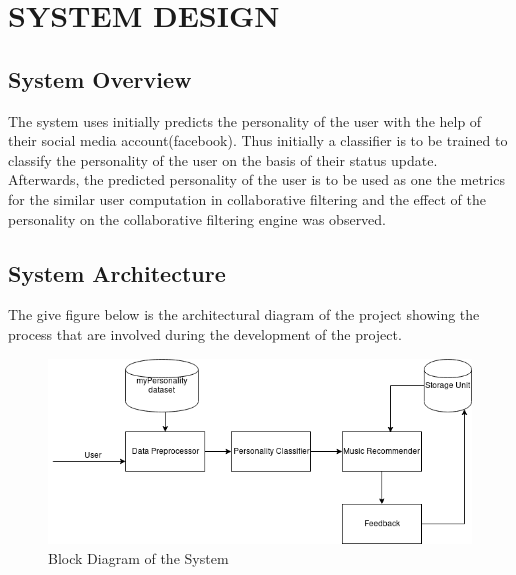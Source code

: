 \newpage
\section{SYSTEM DESIGN}

\subsection{System Overview}
The system uses initially predicts the personality of the user with the help of their social media account(facebook). Thus initially a classifier is to be trained to classify the personality of the user on the basis of their status update. Afterwards, the predicted personality of the user is to be used as one the metrics for the similar user computation in collaborative filtering and the effect of the personality on the collaborative filtering engine was observed.

\subsection{System Architecture}
The give figure below is the architectural diagram of the project showing the process that are involved during the development of the project.

\begin{figure}[!ht]
\centering
\includegraphics[width = 16 cm]{fig/system.png}
\caption{Block Diagram of the System}
\label{fig:project}
\end{figure}

